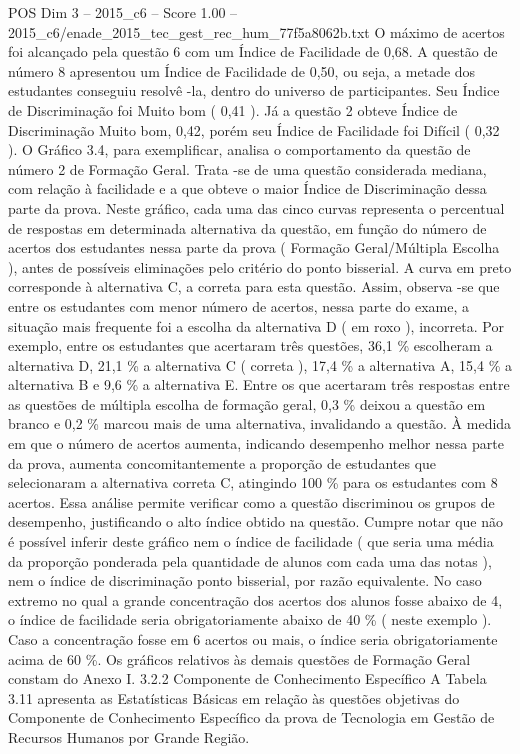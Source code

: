 \begin{textsample}{POS Dim 3 – 2015\_c6 – Score 1.00 – 2015\_c6/enade\_2015\_tec\_gest\_rec\_hum\_77f5a8062b.txt}
O máximo de acertos foi alcançado pela questão 6 com um Índice de Facilidade de 0,68.
A questão de número 8 apresentou um Índice de Facilidade de 0,50, ou seja, a metade dos estudantes conseguiu resolvê -la, dentro do universo de participantes.
Seu Índice de Discriminação foi Muito bom ( 0,41 ).
Já a questão 2 obteve Índice de Discriminação Muito bom, 0,42, porém seu Índice de Facilidade foi Difícil ( 0,32 ).
O Gráfico 3.4, para exemplificar, analisa o comportamento da questão de número 2 de Formação Geral.
Trata -se de uma questão considerada mediana, com relação à facilidade e a que obteve o maior Índice de Discriminação dessa parte da prova.
Neste gráfico, cada uma das cinco curvas representa o percentual de respostas em determinada alternativa da questão, em função do número de acertos dos estudantes nessa parte da prova ( Formação Geral/Múltipla Escolha ), antes de possíveis eliminações pelo critério do ponto bisserial.
A curva em preto corresponde à alternativa C, a correta para esta questão.
Assim, observa -se que entre os estudantes com menor número de acertos, nessa parte do exame, a situação mais frequente foi a escolha da alternativa D ( em roxo ), incorreta.
Por exemplo, entre os estudantes que acertaram três questões, 36,1 \% escolheram a alternativa D, 21,1 \% a alternativa C ( correta ), 17,4 \% a alternativa A, 15,4 \% a alternativa B e 9,6 \% a alternativa E.
Entre os que acertaram três respostas entre as questões de múltipla escolha de formação geral, 0,3 \% deixou a questão em branco e 0,2 \% marcou mais de uma alternativa, invalidando a questão.
À medida em que o número de acertos aumenta, indicando desempenho melhor nessa parte da prova, aumenta concomitantemente a proporção de estudantes que selecionaram a alternativa correta C, atingindo 100 \% para os estudantes com 8 acertos.
Essa análise permite verificar como a questão discriminou os grupos de desempenho, justificando o alto índice obtido na questão.
Cumpre notar que não é possível inferir deste gráfico nem o índice de facilidade ( que seria uma média da proporção ponderada pela quantidade de alunos com cada uma das notas ), nem o índice de discriminação ponto bisserial, por razão equivalente.
No caso extremo no qual a grande concentração dos acertos dos alunos fosse abaixo de 4, o índice de facilidade seria obrigatoriamente abaixo de 40 \% ( neste exemplo ).
Caso a concentração fosse em 6 acertos ou mais, o índice seria obrigatoriamente acima de 60 \%.
Os gráficos relativos às demais questões de Formação Geral constam do Anexo I. 3.2.2 Componente de Conhecimento Específico A Tabela 3.11 apresenta as Estatísticas Básicas em relação às questões objetivas do Componente de Conhecimento Específico da prova de Tecnologia em Gestão de Recursos Humanos por Grande Região.

\end{textsample}

